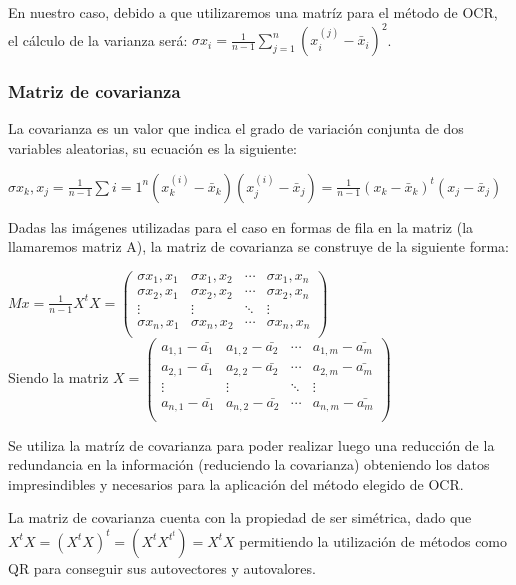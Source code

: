 \documentclass[a4paper,10pt,twoside]{article}
\begin{document}
En nuestro caso, debido a que utilizaremos una matríz para el método de OCR, el cálculo de la varianza será: $\sigma x_i = \frac{1}{n-1} \sum_{j=1}^{n} (x_i^{(j)} - \bar{x}_i)^2$.

\subsubsection{Matriz de covarianza}
La covarianza es un valor que indica el grado de variación conjunta de dos variables aleatorias, su ecuación es la siguiente:

 $\sigma x_k,x_j = \frac{1}{n-1} \sum{i=1}^{n} (x_k^{(i)} - \bar{x}_k)(x_j^{(i)} - \bar{x}_j) = \frac{1}{n-1}(x_k - \bar{x}_k)^{t}(x_j - \bar{x}_j)$

Dadas las imágenes utilizadas para el caso en formas de fila en la matriz (la llamaremos matriz A), la matriz de covarianza se construye de la siguiente forma:

$Mx = \frac{1}{n-1} X^{t}X = 
 \begin{pmatrix}
  \sigma x_1,x_1 & \sigma x_1,x_2 & \cdots & \sigma x_1,x_n \\
  \sigma x_2,x_1 & \sigma x_2,x_2 & \cdots & \sigma x_2,x_n \\
  \vdots  & \vdots  & \ddots & \vdots  \\
  \sigma x_n,x_1 & \sigma x_n,x_2 & \cdots & \sigma x_n,x_n \\
 \end{pmatrix}
$
\\
Siendo la matriz $X = 
 \begin{pmatrix}
  a_{1,1} - \bar{a_1} & a_{1,2} - \bar{a_2} & \cdots & a_{1,m} - \bar{a_m} \\
  a_{2,1} - \bar{a_1} & a_{2,2} - \bar{a_2} & \cdots & a_{2,m} - \bar{a_m} \\
  \vdots  & \vdots  & \ddots & \vdots  \\
  a_{n,1} - \bar{a_1} & a_{n,2} - \bar{a_2} & \cdots & a_{n,m} - \bar{a_m} \\
 \end{pmatrix}
$

Se utiliza la matríz de covarianza para poder realizar luego una reducción de la redundancia en la información (reduciendo la covarianza) obteniendo los datos impresindibles y necesarios para la aplicación del método elegido de OCR.

La matriz de covarianza cuenta con la propiedad de ser simétrica, dado que $X^{t}X = (X^{t}X)^{t} = (X^{t}X^{t^{t}}) = X^{t}X$ permitiendo la utilización de métodos como QR para conseguir sus autovectores y autovalores.
\end{document}
